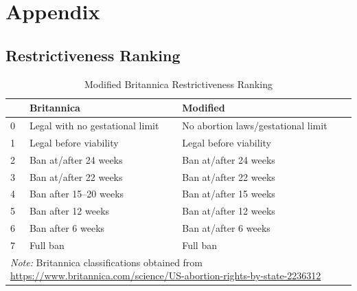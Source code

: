 \section*{Appendix}
\subsection*{Restrictiveness Ranking}
\begin{table}[H]
\centering
\begin{tabular}{p{0.8cm} p{5.5cm} p{6cm}}

\textbf{} & \textbf{Britannica} & \textbf{Modified} \\
\hline
0 & Legal with no gestational limit 
  & No abortion laws/gestational limit \\

1 & Legal before viability 
  & Legal before viability \\

2 & Ban at/after 24 weeks 
  & Ban at/after 24 weeks \\

3 & Ban at/after 22 weeks 
  & Ban at/after 22 weeks \\

4 & Ban after 15--20 weeks 
  & Ban at/after 15 weeks \\

5 & Ban after 12 weeks 
  & Ban at/after 12 weeks \\

6 & Ban after 6 weeks 
  & Ban at/after 6 weeks \\

7 & Full ban 
  & Full ban \\

\hline
\multicolumn{3}{p{12.3cm}}{\footnotesize \textit{Note:} Britannica classifications obtained from 
\url{https://www.britannica.com/science/US-abortion-rights-by-state-2236312}} 

\end{tabular}
\caption{Modified Britannica Restrictiveness Ranking}
\end{table} 


